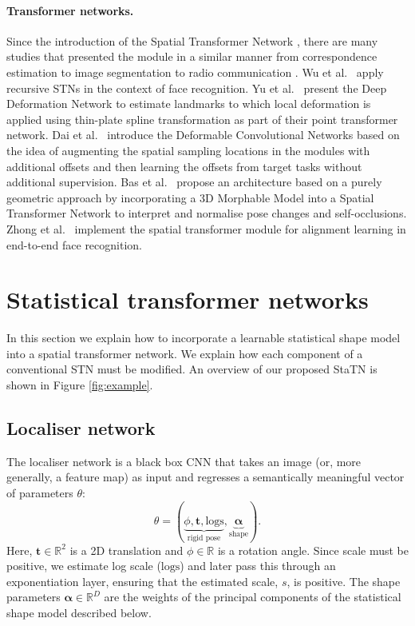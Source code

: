 \documentclass[runningheads]{llncs}
\newcommand{\R}{\mathbb{R}}
\newcommand{\logs}{\textrm{logs}}
\newcommand{\etal}{{et al.~}}
\begin{document}

\paragraph{Transformer networks.}

Since the introduction of the Spatial Transformer Network \cite{jaderberg2015spatial}, there are many studies that presented the module in a similar manner from correspondence estimation \cite{choy2016universal} to image segmentation \cite{li2017dense} to radio communication \cite{o2016radio}.
Wu \etal \cite{wu2017recursive} apply recursive STNs in the context of face recognition.
Yu \etal \cite{yu2016deep} present the Deep Deformation Network to estimate landmarks to which local deformation is applied using thin-plate spline transformation as part of their point transformer network.
Dai \etal \cite{dai2017deformable} introduce the Deformable Convolutional Networks based on the idea of augmenting the spatial sampling locations in the modules with additional offsets and then learning the offsets from target tasks without additional supervision.
Bas \etal \cite{bas20173D} propose an architecture based on a purely geometric approach by incorporating a 3D Morphable Model into a Spatial Transformer Network to interpret and normalise pose changes and self-occlusions.
Zhong \etal \cite{zhong2017towards} implement the spatial transformer module for alignment learning in end-to-end face recognition.


\section{Statistical transformer networks}

In this section we explain how to incorporate a learnable statistical shape model into a spatial transformer network. We explain how each component of a conventional STN must be modified. An overview of our proposed StaTN is shown in Figure \ref{fig:example}.

\subsection{Localiser network}

The localiser network is a black box CNN that takes an image (or, more generally, a feature map) as input and regresses a semantically meaningful vector of parameters $\theta$:
\begin{equation}
    \theta = (\underbrace{\phi,\mathbf{t},\logs}_{\textrm{rigid pose}},\underbrace{{\bm \alpha}}_{\textrm{shape}}).
\end{equation}
Here, $\mathbf{t}\in\R^2$ is a 2D translation and $\phi\in\R$ is a rotation angle. Since scale must be positive, we estimate log scale ($\logs$) and later pass this through an exponentiation layer, ensuring that the estimated scale, $s$, is positive. The shape parameters ${\bm \alpha}\in\R^D$ are the weights of the principal components of the statistical shape model described below.
\end{document}
